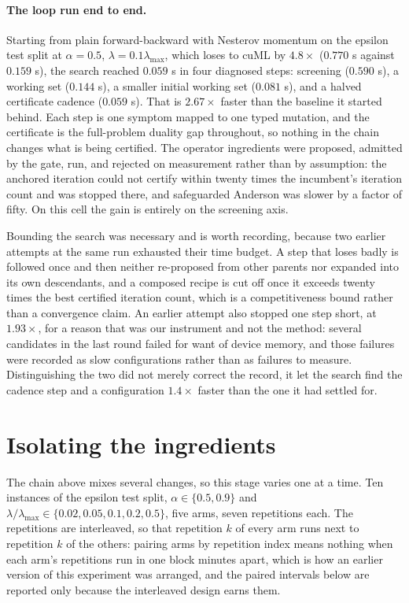 \documentclass[11pt]{article}
\begin{document}
\paragraph{The loop run end to end.}

Starting from
plain forward-backward with Nesterov momentum on the epsilon test split at
$\alpha=0.5$, $\lambda=0.1\lambda_{\max}$, which loses to cuML by $4.8\times$
($0.770$ s against $0.159$ s), the search reached $0.059$ s in four diagnosed
steps: screening ($0.590$ s), a working set ($0.144$ s), a smaller initial
working set ($0.081$ s), and a halved certificate cadence ($0.059$ s). That is
$2.67\times$ faster than the baseline it started behind. Each step is one
symptom mapped to one typed mutation, and the certificate is the full-problem
duality gap throughout, so nothing in the chain changes what is being certified.
The operator ingredients were proposed, admitted by the gate, run, and rejected
on measurement rather than by assumption: the anchored iteration could not
certify within twenty times the incumbent's iteration count and was stopped
there, and safeguarded Anderson was slower by a factor of fifty. On this cell
the gain is entirely on the screening axis.

Bounding the search was necessary and is worth recording, because two earlier
attempts at the same run exhausted their time budget. A step that loses badly is
followed once and then neither re-proposed from other parents nor expanded into
its own descendants, and a composed recipe is cut off once it exceeds twenty
times the best certified iteration count, which is a competitiveness bound
rather than a convergence claim. An earlier attempt also stopped one step short,
at $1.93\times$, for a reason that was our instrument and not the method: several
candidates in the last round failed for want of device memory, and those
failures were recorded as slow configurations rather than as failures to
measure. Distinguishing the two did not merely correct the record, it let the
search find the cadence step and a configuration $1.4\times$ faster than the one
it had settled for.

\section{Isolating the ingredients}
\label{app:log:ablation}

 The chain above mixes several changes, so
this stage varies one at a time. Ten instances of the epsilon test split,
$\alpha \in \{0.5, 0.9\}$ and $\lambda/\lambda_{\max} \in \{0.02, 0.05, 0.1, 0.2,
0.5\}$, five arms, seven repetitions each. The repetitions are interleaved, so
that repetition $k$ of every arm runs next to repetition $k$ of the others:
pairing arms by repetition index means nothing when each arm's repetitions run
in one block minutes apart, which is how an earlier version of this experiment
was arranged, and the paired intervals below are reported only because the
interleaved design earns them.
\end{document}
